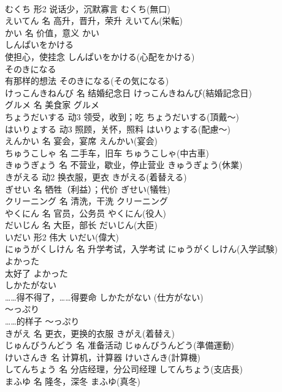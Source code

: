 \documentclass[8pt]{extreport}
\begin{document}
\begin{CJK}{UTF8}{min}
\\	むくち	形2	说话少，沉默寡言	むくち(無口)	
\\	えいてん	名	高升，晋升，荣升	えいてん(栄転)	
\\	かい	名	价值，意义	かい	
\\	しんぱいをかける	
\\	使担心，使挂念	しんぱいをかける(心配をかける)	
\\	そのきになる	
\\	有那样的想法	そのきになる(その気になる)	
\\	けっこんきねんび	名	结婚纪念日	けっこんきねんび(結婚記念日)	
\\	グルメ	名	美食家	グルメ	
\\	ちょうだいする	动3	领受，收到；吃	ちょうだいする(頂戴～)	
\\	はいりょする	动3	照顾，关怀，照料	はいりょする(配慮～)	
\\	えんかい	名	宴会，宴席	えんかい(宴会)	
\\	ちゅうこしゃ	名	二手车，旧车	ちゅうこしゃ(中古車)	
\\	きゅうぎょう	名	不营业，歇业，停止营业	きゅうぎょう(休業)	
\\	きがえる	动2	换衣服，更衣	きがえる(着替える)	
\\	ぎせい	名	牺牲（利益）；代价	ぎせい(犠牲)	
\\	クリーニング	名	清洗，干洗	クリーニング	
\\	やくにん	名	官员，公务员	やくにん(役人)	
\\	だいじん	名	大臣，部长	だいじん(大臣)	
\\	いだい	形2	伟大	いだい(偉大)	
\\	にゅうがくしけん	名	升学考试，入学考试	にゅうがくしけん(入学試験)	
\\	よかった	
\\	太好了	よかった	
\\	しかたがない	
\\	……得不得了，……得要命	しかたがない (仕方がない)	
\\	～っぷり	
\\	……的样子	～っぷり	
\\	きがえ	名	更衣，更换的衣服	きがえ(着替え)	
\\	じゅんびうんどう	名	准备活动	じゅんびうんどう(準備運動)	
\\	けいさんき	名	计算机，计算器	けいさんき(計算機)	
\\	してんちょう	名	分店经理，分公司经理	してんちょう(支店長)	
\\	まふゆ	名	隆冬，深冬	まふゆ(真冬)	

\end{CJK}
\end{document}
